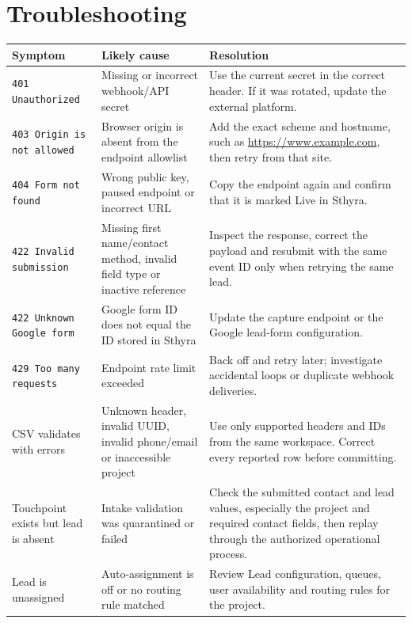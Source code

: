 \documentclass[11pt,a4paper]{article}
\newcommand{\code}[1]{\texttt{#1}}
\begin{document}
\section{Troubleshooting}

\begin{longtable}{@{}p{34mm}p{48mm}p{\dimexpr\textwidth-90mm\relax}@{}}
\toprule
Symptom & Likely cause & Resolution \\
\midrule
\endhead
\code{401 Unauthorized} & Missing or incorrect webhook/API secret & Use the current secret in the correct header. If it was rotated, update the external platform. \\
\addlinespace
\code{403 Origin is not allowed} & Browser origin is absent from the endpoint allowlist & Add the exact scheme and hostname, such as \url{https://www.example.com}, then retry from that site. \\
\addlinespace
\code{404 Form not found} & Wrong public key, paused endpoint or incorrect URL & Copy the endpoint again and confirm that it is marked Live in Sthyra. \\
\addlinespace
\code{422 Invalid submission} & Missing first name/contact method, invalid field type or inactive reference & Inspect the response, correct the payload and resubmit with the same event ID only when retrying the same lead. \\
\addlinespace
\code{422 Unknown Google form} & Google form ID does not equal the ID stored in Sthyra & Update the capture endpoint or the Google lead-form configuration. \\
\addlinespace
\code{429 Too many requests} & Endpoint rate limit exceeded & Back off and retry later; investigate accidental loops or duplicate webhook deliveries. \\
\addlinespace
CSV validates with errors & Unknown header, invalid UUID, invalid phone/email or inaccessible project & Use only supported headers and IDs from the same workspace. Correct every reported row before committing. \\
\addlinespace
Touchpoint exists but lead is absent & Intake validation was quarantined or failed & Check the submitted contact and lead values, especially the project and required contact fields, then replay through the authorized operational process. \\
\addlinespace
Lead is unassigned & Auto-assignment is off or no routing rule matched & Review Lead configuration, queues, user availability and routing rules for the project. \\
\bottomrule
\end{longtable}
\end{document}
